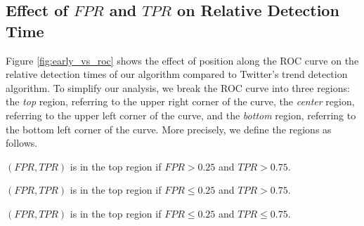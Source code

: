 \clearpage
\subsection{Effect of $FPR$ and $TPR$ on Relative Detection Time}
\label{sec:rel_det}
Figure \ref{fig:early_vs_roc} shows the effect of position along the ROC curve
on the relative detection times of our algorithm compared to Twitter's trend
detection algorithm. To simplify our analysis, we break the ROC curve into three
regions: the {\em top} region, referring to the upper right corner of the curve,
the {\em center} region, referring to the upper left corner of the curve, and
the {\em bottom} region, referring to the bottom left corner of the curve. More
precisely, we define the regions as follows.

\begin{defn}
$(FPR,TPR)$ is in the top region if $FPR > 0.25$ and $TPR > 0.75$.
\end{defn}
\begin{defn}
$(FPR,TPR)$ is in the top region if $FPR \leq 0.25$ and $TPR > 0.75$.
\end{defn}
\begin{defn}
$(FPR,TPR)$ is in the top region if $FPR \leq 0.25$ and $TPR \leq 0.75$.
\end{defn}

